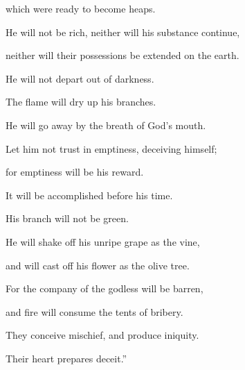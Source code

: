 {\par }{\QB which were ready to become heaps.
\par }{\Q {}He will not be rich, neither will his substance continue,
\par }{\QB neither will their possessions be extended on the earth.
\par }{\Q {}He will not depart out of darkness.
\par }{\QB The flame will dry up his branches.
\par }{\QB He will go away by the breath of God’s mouth.
\par }{\Q {}Let him not trust in emptiness, deceiving himself;
\par }{\QB for emptiness will be his reward.
\par }{\Q {}It will be accomplished before his time.
\par }{\QB His branch will not be green.
\par }{\Q {}He will shake off his unripe grape as the vine,
\par }{\QB and will cast off his flower as the olive tree.
\par }{\Q {}For the company of the godless will be barren,
\par }{\QB and fire will consume the tents of bribery.
\par }{\Q {}They conceive mischief, and produce iniquity.
\par }{\QB Their heart prepares deceit.”
\par }{\BB \par }
